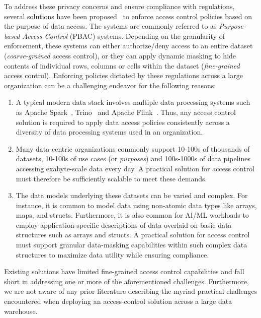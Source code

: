 To address these privacy concerns and ensure compliance with regulations, several solutions have been proposed~\cite{Byun05, Colombo17, Xue23} to enforce access control policies based on the purpose of data access. The systems are commonly referred to as \emph{Purpose-based Access Control} (PBAC) systems. Depending on the granularity of enforcement, these systems can either authorize/deny access to an entire dataset (\emph{coarse-grained} access control), or they can apply dynamic masking to hide contents of individual rows, columns or cells within the dataset (\emph{fine-grained} access control).  Enforcing policies dictated by these regulations across a large organization can be a challenging endeavor for the following reasons: 
\begin{enumerate}
\item A typical modern data stack involves multiple data processing systems such as Apache Spark~\cite{Spark}, Trino~\cite{Trino} and Apache Flink~\cite{Flink}. Thus, any access control solution is required to apply data access policies consistently across a diversity of data processing systems used in an organization. 
\item Many data-centric organizations commonly support 10-100s of thousands of datasets, 10-100s of use cases (or {\em purposes}) and 100s-1000s of data pipelines accessing exabyte-scale data every day. A practical solution for access control must therefore be sufficiently scalable to meet these demands.
\item The data models underlying these datasets can be varied and complex. For instance, it is common to model data using non-atomic data types like arrays, maps, and structs. Furthermore, it is also common for AI/ML workloads to employ application-specific descriptions of data overlaid on basic data structures such as arrays and structs. A practical solution for access control must support granular data-masking capabilities within such complex data structures to maximize data utility while ensuring compliance. 
\end{enumerate} 
Existing solutions have limited fine-grained access control capabilities and fall short in addressing one or more of the aforementioned challenges. Furthermore, we are not aware of any prior literature describing the myriad practical challenges encountered when deploying an access-control solution across a large data warehouse.


